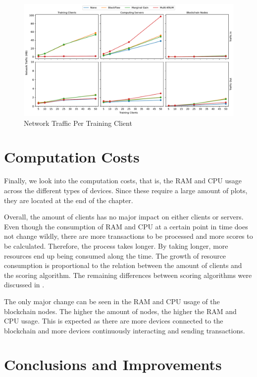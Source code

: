 \begin{figure}[!ht]
    \centering
    \includegraphics[width=\textwidth]{graphics/clients/traffic.pdf}
    \caption{Network Traffic Per Training Client}
    \label{fig:net_clients}
\end{figure}


\section{Computation Costs}

Finally, we look into the computation costs, that is, the RAM and CPU usage across the different types of devices. Since these require a large amount of plots, they are located at the end of the chapter.

Overall, the amount of clients has no major impact on either clients or servers. Even though the consumption of RAM and CPU at a certain point in time does not change wildly, there are more transactions to be processed and more scores to be calculated. Therefore, the process takes longer. By taking longer, more resources end up being consumed along the time. The growth of resource consumption is proportional to the relation between the amount of clients and the scoring algorithm. The remaining differences between scoring algorithms were discussed in .

The only major change can be seen in the RAM and CPU usage of the blockchain nodes. The higher the amount of nodes, the higher the RAM and CPU usage. This is expected as there are more devices connected to the blockchain and more devices continuously interacting and sending transactions.

\section{Conclusions and Improvements}

